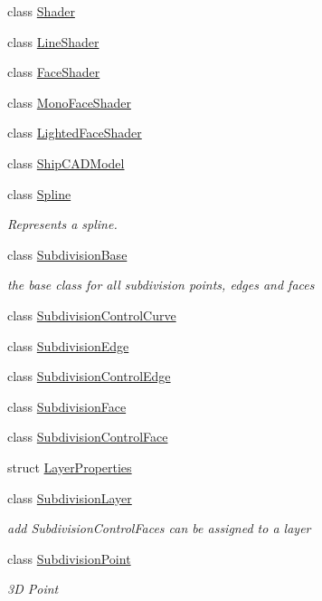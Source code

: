 \begin{DoxyCompactItemize}
\item 
class \hyperlink{classShipCAD_1_1Shader}{Shader}
\item 
class \hyperlink{classShipCAD_1_1LineShader}{Line\-Shader}
\item 
class \hyperlink{classShipCAD_1_1FaceShader}{Face\-Shader}
\item 
class \hyperlink{classShipCAD_1_1MonoFaceShader}{Mono\-Face\-Shader}
\item 
class \hyperlink{classShipCAD_1_1LightedFaceShader}{Lighted\-Face\-Shader}
\item 
class \hyperlink{classShipCAD_1_1ShipCADModel}{Ship\-C\-A\-D\-Model}
\item 
class \hyperlink{classShipCAD_1_1Spline}{Spline}
\begin{DoxyCompactList}\small\item\em Represents a spline. \end{DoxyCompactList}\item 
class \hyperlink{classShipCAD_1_1SubdivisionBase}{Subdivision\-Base}
\begin{DoxyCompactList}\small\item\em the base class for all subdivision points, edges and faces \end{DoxyCompactList}\item 
class \hyperlink{classShipCAD_1_1SubdivisionControlCurve}{Subdivision\-Control\-Curve}
\item 
class \hyperlink{classShipCAD_1_1SubdivisionEdge}{Subdivision\-Edge}
\item 
class \hyperlink{classShipCAD_1_1SubdivisionControlEdge}{Subdivision\-Control\-Edge}
\item 
class \hyperlink{classShipCAD_1_1SubdivisionFace}{Subdivision\-Face}
\item 
class \hyperlink{classShipCAD_1_1SubdivisionControlFace}{Subdivision\-Control\-Face}
\item 
struct \hyperlink{structShipCAD_1_1LayerProperties}{Layer\-Properties}
\item 
class \hyperlink{classShipCAD_1_1SubdivisionLayer}{Subdivision\-Layer}
\begin{DoxyCompactList}\small\item\em add Subdivision\-Control\-Faces can be assigned to a layer \end{DoxyCompactList}\item 
class \hyperlink{classShipCAD_1_1SubdivisionPoint}{Subdivision\-Point}
\begin{DoxyCompactList}\small\item\em 3\-D Point \end{DoxyCompactList}\item 

\end{DoxyCompactItemize}
